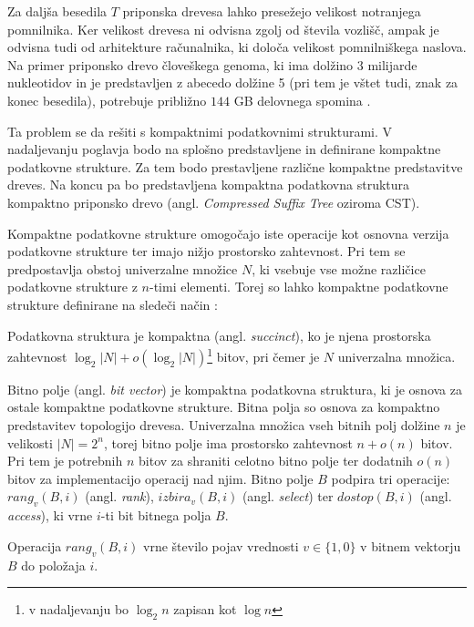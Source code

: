 Za daljša besedila $T$ priponska drevesa lahko presežejo velikost notranjega pomnilnika. Ker velikost drevesa ni odvisna zgolj od števila vozlišč, ampak je odvisna tudi od arhitekture računalnika, ki določa velikost pomnilniškega naslova. Na primer priponsko drevo človeškega genoma, ki ima dolžino 3 milijarde nukleotidov in je predstavljen z abecedo dolžine 5 (pri tem je vštet tudi, znak za konec besedila), potrebuje približno $144$ GB delovnega spomina \cite{GENOMEKNOWLEDGEHUB-2024-10-30}.

Ta problem se da rešiti s kompaktnimi podatkovnimi strukturami. V nadaljevanju poglavja bodo na splošno predstavljene in definirane kompaktne podatkovne strukture. Za tem bodo prestavljene različne kompaktne predstavitve dreves. Na koncu pa bo predstavljena kompaktna podatkovna struktura kompaktno priponsko drevo (angl. \textit{Compressed Suffix Tree} oziroma CST).


Kompaktne podatkovne strukture omogočajo iste operacije kot osnovna verzija podatkovne strukture ter imajo nižjo prostorsko zahtevnost. Pri tem se predpostavlja obstoj univerzalne množice $N$, ki vsebuje vse možne različice podatkovne strukture z $n$-timi elementi. Torej so lahko kompaktne podatkovne strukture definirane na sledeči način \cite{Navarro2016}:

\begin{defi}
    Podatkovna struktura je kompaktna (angl. \textit{succinct}), ko je njena prostorska zahtevnost $\log_2{\left |N\right |} + o(\log_2{\left |N\right |})$\footnote{v nadaljevanju bo $\log_2 n$ zapisan kot $\log n$ } bitov, pri čemer je $N$ univerzalna množica.
\end{defi}

Bitno polje (angl. \textit{bit vector}) je kompaktna podatkovna struktura, ki je osnova za ostale kompaktne podatkovne strukture. Bitna polja so osnova za kompaktno predstavitev topologijo drevesa. Univerzalna množica vseh bitnih polj dolžine $n$ je velikosti $\left |N\right |=2^n$, torej bitno polje ima prostorsko zahtevnost $n+o(n)$ bitov. Pri tem je potrebnih $n$ bitov za shraniti celotno bitno polje ter dodatnih $o(n)$ bitov za implementacijo operacij nad njim. Bitno polje $B$ podpira tri operacije: $rang_v(B,i)$ (angl. \textit{rank}), $izbira_v(B,i)$  (angl. \textit{select}) ter $dostop(B,i)$ (angl. \textit{access}), ki vrne $i$-ti bit bitnega polja $B$.

\begin{defi}
   Operacija $rang_v(B,i)$ vrne število pojav vrednosti $v\in\{1,0\}$ v bitnem vektorju $B$ do položaja $i$.
\end{defi}

